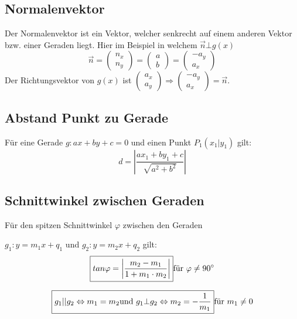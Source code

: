 \subsection{Normalenvektor}
Der Normalenvektor ist ein Vektor, welcher senkrecht auf einem anderen Vektor bzw. einer Geraden liegt. Hier im Beispiel in welchem $ \vec{n} \bot g(x)$
\[ \boxed{ \vec{n} = 
      \left( 
	\begin{array}{cc} 
	  n_x \\ n_y
	\end{array}
      \right)
      =
      \left( 
	\begin{array}{cc} 
	  a \\ b
	\end{array}
      \right)
      =
      \left( 
	\begin{array}{cc} 
	  -a_y \\ a_x
	\end{array}
      \right)
} \]
\noindent
Der Richtungsvektor von $g(x)$ ist 
$  
      \left( 
	\begin{array}{cc} 
	  a_x \\ a_y
	\end{array}
      \right)
      \Rightarrow 
      \left( 
	\begin{array}{cc} 
	  -a_y \\ a_x
	\end{array}
      \right)
      = \vec{n}
$.

\subsection{Abstand Punkt zu Gerade}
Für eine Gerade $g: ax + by + c = 0$ und einen Punkt $P_1 (x_1 | y_1)$ gilt:
\[ \boxed{ d = \left| \frac{ax_1 + by_1 + c}{\sqrt{a^2 + b^2}} \right| } \]

\subsection{Schnittwinkel zwischen Geraden}
Für den spitzen Schnittwinkel $\varphi$ zwischen den Geraden 

$g_1: y = m_1x + q_1$ und $g_2: y = m_2x + q_2$ gilt:
\[ \boxed{ tan\varphi = \left| \frac{m_2 - m_1}{1 + m_1 \cdot m_2} \right| } \\ \text{für } \varphi \neq 90^{\circ} \]

\[ \boxed{ g_1 || g_2 \Leftrightarrow m_1 = m_2 \text{und } g_1 \bot g_2 \Leftrightarrow m_2 = - \frac{1}{m_1} } \\ \text{für } m_1 \neq 0 \]


